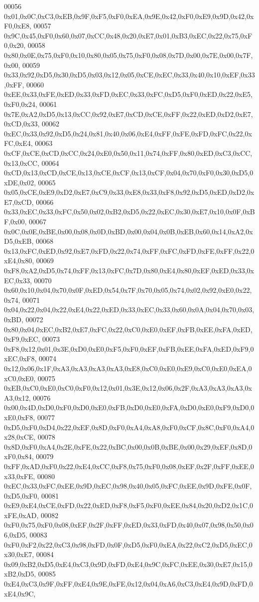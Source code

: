 \begin{DoxyCode}
00056 0x01,0x0C,0xC3,0xEB,0x9F,0xF5,0xF0,0xEA,0x9E,0x42,0xF0,0xE9,0x9D,0x42,0xF0,0xE8,
00057 0x9C,0x45,0xF0,0x60,0x07,0xCC,0x48,0x20,0xE7,0x01,0xB3,0xEC,0x22,0x75,0xF0,0x20,
00058 0x80,0x0E,0x75,0xF0,0x10,0x80,0x05,0x75,0xF0,0x08,0x7D,0x00,0x7E,0x00,0x7F,0x00,
00059 0x33,0x92,0xD5,0x30,0xD5,0x03,0x12,0x05,0xCE,0xEC,0x33,0x40,0x10,0xEF,0x33,0xFF,
00060 0xEE,0x33,0xFE,0xED,0x33,0xFD,0xEC,0x33,0xFC,0xD5,0xF0,0xED,0x22,0xE5,0xF0,0x24,
00061 0x7E,0xA2,0xD5,0x13,0xCC,0x92,0xE7,0xCD,0xCE,0xFF,0x22,0xED,0xD2,0xE7,0xCD,0x33,
00062 0xEC,0x33,0x92,0xD5,0x24,0x81,0x40,0x06,0xE4,0xFF,0xFE,0xFD,0xFC,0x22,0xFC,0xE4,
00063 0xCF,0xCE,0xCD,0xCC,0x24,0xE0,0x50,0x11,0x74,0xFF,0x80,0xED,0xC3,0xCC,0x13,0xCC,
00064 0xCD,0x13,0xCD,0xCE,0x13,0xCE,0xCF,0x13,0xCF,0x04,0x70,0xF0,0x30,0xD5,0xDE,0x02,
00065 0x05,0xCE,0xE9,0xD2,0xE7,0xC9,0x33,0xE8,0x33,0xF8,0x92,0xD5,0xED,0xD2,0xE7,0xCD,
00066 0x33,0xEC,0x33,0xFC,0x50,0x02,0xB2,0xD5,0x22,0xEC,0x30,0xE7,0x10,0x0F,0xBF,0x00,
00067 0x0C,0x0E,0xBE,0x00,0x08,0x0D,0xBD,0x00,0x04,0x0B,0xEB,0x60,0x14,0xA2,0xD5,0xEB,
00068 0x13,0xFC,0xED,0x92,0xE7,0xFD,0x22,0x74,0xFF,0xFC,0xFD,0xFE,0xFF,0x22,0xE4,0x80,
00069 0xF8,0xA2,0xD5,0x74,0xFF,0x13,0xFC,0x7D,0x80,0xE4,0x80,0xEF,0xED,0x33,0xEC,0x33,
00070 0x60,0x10,0x04,0x70,0x0F,0xED,0x54,0x7F,0x70,0x05,0x74,0x02,0x92,0xE0,0x22,0x74,
00071 0x04,0x22,0x04,0x22,0xE4,0x22,0xED,0x33,0xEC,0x33,0x60,0x0A,0x04,0x70,0x03,0xBD,
00072 0x80,0x04,0xEC,0xB2,0xE7,0xFC,0x22,0xC0,0xE0,0xEF,0xFB,0xEE,0xFA,0xED,0xF9,0xEC,
00073 0xF8,0x12,0x01,0x3E,0xD0,0xE0,0xF5,0xF0,0xEF,0xFB,0xEE,0xFA,0xED,0xF9,0xEC,0xF8,
00074 0x12,0x06,0x1F,0xA3,0xA3,0xA3,0xA3,0xE8,0xC0,0xE0,0xE9,0xC0,0xE0,0xEA,0xC0,0xE0,
00075 0xEB,0xC0,0xE0,0xC0,0xF0,0x12,0x01,0x3E,0x12,0x06,0x2F,0xA3,0xA3,0xA3,0xA3,0x12,
00076 0x00,0x4D,0xD0,0xF0,0xD0,0xE0,0xFB,0xD0,0xE0,0xFA,0xD0,0xE0,0xF9,0xD0,0xE0,0xF8,
00077 0xD5,0xF0,0xD4,0x22,0xEF,0x8D,0xF0,0xA4,0xA8,0xF0,0xCF,0x8C,0xF0,0xA4,0x28,0xCE,
00078 0x8D,0xF0,0xA4,0x2E,0xFE,0x22,0xBC,0x00,0x0B,0xBE,0x00,0x29,0xEF,0x8D,0xF0,0x84,
00079 0xFF,0xAD,0xF0,0x22,0xE4,0xCC,0xF8,0x75,0xF0,0x08,0xEF,0x2F,0xFF,0xEE,0x33,0xFE,
00080 0xEC,0x33,0xFC,0xEE,0x9D,0xEC,0x98,0x40,0x05,0xFC,0xEE,0x9D,0xFE,0x0F,0xD5,0xF0,
00081 0xE9,0xE4,0xCE,0xFD,0x22,0xED,0xF8,0xF5,0xF0,0xEE,0x84,0x20,0xD2,0x1C,0xFE,0xAD,
00082 0xF0,0x75,0xF0,0x08,0xEF,0x2F,0xFF,0xED,0x33,0xFD,0x40,0x07,0x98,0x50,0x06,0xD5,
00083 0xF0,0xF2,0x22,0xC3,0x98,0xFD,0x0F,0xD5,0xF0,0xEA,0x22,0xC2,0xD5,0xEC,0x30,0xE7,
00084 0x09,0xB2,0xD5,0xE4,0xC3,0x9D,0xFD,0xE4,0x9C,0xFC,0xEE,0x30,0xE7,0x15,0xB2,0xD5,
00085 0xE4,0xC3,0x9F,0xFF,0xE4,0x9E,0xFE,0x12,0x04,0xA6,0xC3,0xE4,0x9D,0xFD,0xE4,0x9C,

\end{DoxyCode}
